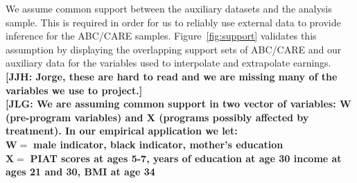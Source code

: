 \noindent We assume common support between the auxiliary datasets and the analysis sample. This is required in order for us to reliably use external data to provide inference for the ABC/CARE samples. Figure~\ref{fig:support} validates this assumption by displaying the overlapping support sets of ABC/CARE and our auxiliary data for the variables used to interpolate and extrapolate earnings.  \\

\noindent \textbf{[JJH: Jorge, these are hard to read and we are missing many of the variables we use to project.]} \\
\textbf{[JLG: We are assuming common support in two vector of variables: W (pre-program variables) and X (programs possibly affected by treatment). In our empirical application we let:} \\

\noindent $\mathbf{W =}$ \textbf{male indicator, black indicator, mother's education} \\
\noindent $\mathbf{X =} $ \textbf{PIAT scores at ages 5-7, years of education at age 30 income at ages 21 and 30, BMI at age 34}


